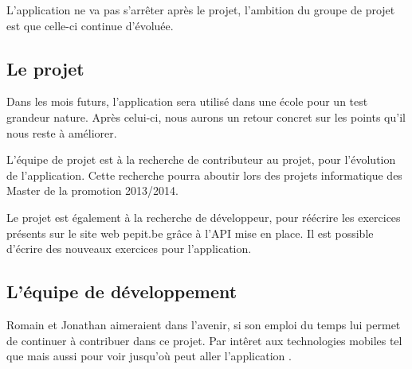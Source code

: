 L'application ne va pas s'arrêter après le projet, l'ambition du groupe de projet est que celle-ci continue d'évoluée.


\subsection{Le projet}
Dans les mois futurs, l'application sera utilisé dans une école pour un test grandeur nature. Après celui-ci, nous aurons un retour concret sur les points qu'il nous reste à améliorer.


L'équipe de projet est à la recherche de contributeur au projet, pour l'évolution de l'application. Cette recherche pourra aboutir lors des projets informatique des Master de la promotion 2013/2014.


Le projet est également à la recherche de développeur, pour réécrire les exercices présents sur le site web pepit.be gr\^{a}ce à l'API mise en place. Il est possible d'écrire des nouveaux exercices pour l'application.

\subsection{L'équipe de développement}
Romain et Jonathan aimeraient dans l'avenir, si son emploi du temps lui permet de continuer à contribuer dans ce projet. Par int\^{e}ret aux technologies mobiles tel que \android{} mais aussi pour voir jusqu'où peut aller l'application \pepitMobil{}. 

